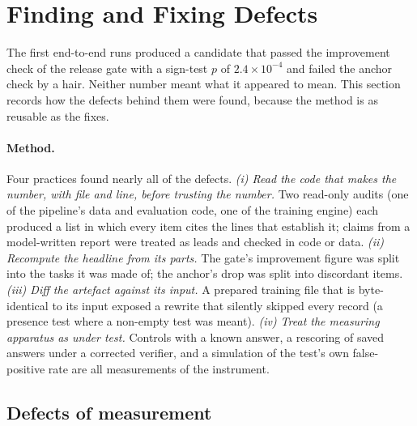 
\section{Finding and Fixing Defects}\label{sec:defects}

The first end-to-end runs produced a candidate that passed the improvement check of the
release gate with a sign-test $p$ of $2.4\times10^{-4}$ and failed the anchor check by a
hair. Neither number meant what it appeared to mean. This section records how the
defects behind them were found, because the method is as reusable as the fixes.

\paragraph{Method.}
Four practices found nearly all of the defects.
\emph{(i) Read the code that makes the number, with file and line, before trusting the number.}
Two read-only audits (one of the pipeline's data and evaluation code, one of the training
engine) each produced a list in which every item cites the lines that establish it; claims
from a model-written report were treated as leads and checked in code or data.
\emph{(ii) Recompute the headline from its parts.} The gate's improvement figure was split
into the tasks it was made of; the anchor's drop was split into discordant items.
\emph{(iii) Diff the artefact against its input.} A prepared training file that is
byte-identical to its input exposed a rewrite that silently skipped every record
(a presence test where a non-empty test was meant). \emph{(iv) Treat the measuring
apparatus as under test.} Controls with a known answer, a rescoring of saved answers under a
corrected verifier, and a simulation of the test's own false-positive rate are all
measurements of the instrument.

\subsection{Defects of measurement}

